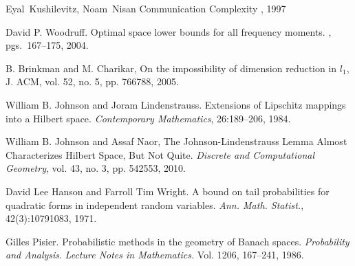 \documentclass[11pt]{article}
\begin{document}
\begin{thebibliography}{42}
Eyal~Kushilevitz, Noam~Nisan
\newblock Communication Complexity
, 1997

David P. Woodruff.
\newblock Optimal space lower bounds for all frequency moments. 
, pgs.\ 167--175, 2004.

B. Brinkman and M. Charikar, On the impossibility
of dimension reduction in $l_{1}$, J. ACM, vol. 52, no. 5, pp. 766\textendash{}788,
2005.

William B. Johnson and Joram Lindenstrauss. Extensions
of Lipschitz mappings into a Hilbert space. {\em Contemporary Mathematics}, 26:189--206, 1984.

William B. Johnson and Assaf Naor, The Johnson-Lindenstrauss
Lemma Almost Characterizes Hilbert Space, But Not Quite. {\em Discrete
and Computational Geometry}, vol. 43, no. 3, pp. 542\textendash{}553, 2010.

David Lee Hanson and Farroll Tim Wright. A bound
on tail probabilities for quadratic forms in independent random variables.
{\em Ann. Math. Statist.}, 42(3):1079\textendash{}1083, 1971.

Gilles Pisier. Probabilistic methods in the geometry of Banach spaces. {\em Probability and Analysis}. {\em Lecture Notes in Mathematics.} Vol. 1206, 167--241, 1986.

\end{thebibliography}
\end{document}
